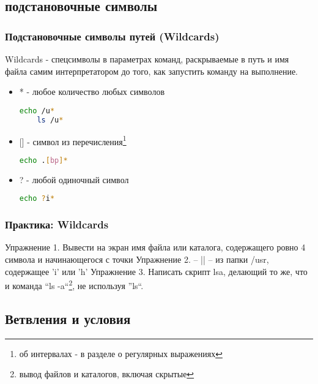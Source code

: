 \subsection{подстановочные символы}
\begin{frame}[fragile]
  \frametitle{Подстановочные символы путей (Wildcards)}

  \alert{Wildcards} - спецсимволы в параметрах команд, раскрываемые в путь и имя файла самим интерпретатором до того, как запустить команду на выполнение. \pause


  \begin{itemize}
    \item \alert{*} - любое количество любых символов
      \begin{lstlisting}[language=sh,frame=single,basicstyle=\normalsize,breaklines=true]
	echo /u*
	ls /u*
      \end{lstlisting} \pause
    \item \alert{[]} - символ из перечисления\footnote{об интервалах - в разделе о регулярных выражениях}
      \begin{lstlisting}[language=sh,frame=single,basicstyle=\normalsize,breaklines=true]
	echo .[bp]*
      \end{lstlisting} \pause
    \item \alert{?} - любой одиночный символ
      \begin{lstlisting}[language=sh,frame=single,basicstyle=\normalsize,breaklines=true]
	echo ?i*
      \end{lstlisting} 
  \end{itemize}

\end{frame}

\begin{frame}
  \frametitle{Практика: Wildcards}

  \alert{Упражнение 1.} Вывести на экран имя файла или каталога, содержащего ровно 4 символа и начинающегося с точки
  \pause
  \alert{Упражнение 2.} -- || --  из папки /usr, содержащее 'i' или 'h'
  \pause
  \alert{Упражнение 3.} Написать скрипт lsa, делающий то же, что и команда ``ls -a``\footnote{вывод файлов и каталогов, включая скрытые}, не используя ''ls``.
\end{frame}

\subsection{Ветвления и условия}


